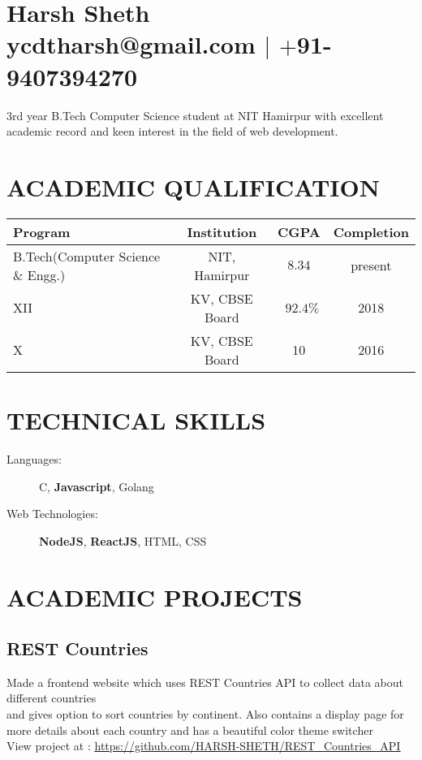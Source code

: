\documentclass[12pt]{article}
\begin{document}
\section{Harsh Sheth\\ ycdtharsh@gmail.com $|$ $+$91-9407394270}
\par{3rd year B.Tech Computer Science student at NIT Hamirpur with excellent academic record and keen interest in the field of web development.}

\section{ACADEMIC QUALIFICATION}
\begin{tabular}{|l|c|c|c|}
  \hline
  Program & Institution & CGPA & Completion \\
  \hline
  B.Tech(Computer Science \& Engg.) & NIT, Hamirpur & $8.34$ & present\\
  XII & KV, CBSE Board & \ $92.4\%$ & 2018\\
  X & KV, CBSE Board & 10 & 2016\\
  \hline
\end{tabular}

\section{TECHNICAL SKILLS}
\begin{description}
  \item[Languages:]{C, \textbf{Javascript}, Golang}
  \item[Web Technologies:]{\textbf{NodeJS}, \textbf{ReactJS}, HTML, CSS}
  \item[]
\end{description}


\section{ACADEMIC PROJECTS}
\subsection*{REST Countries}
  \parbox{\textwidth}{ Made a frontend website which uses REST Countries API to collect data about different countries\\
   and gives option to sort countries by continent. Also contains a display page for more details about each country and has a beautiful color theme switcher\\
   View project at : \underline{\url{https://github.com/HARSH-SHETH/REST_Countries_API}}
  }
\end{document}

